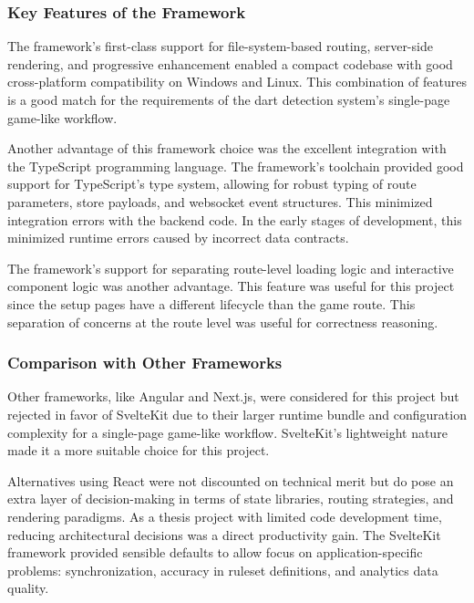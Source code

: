 \subsubsection{Key Features of the Framework}
The framework's first-class support for file-system-based routing, server-side rendering, and progressive enhancement enabled a compact codebase with good cross-platform compatibility on Windows and Linux. This combination of features is a good match for the requirements of the dart detection system's single-page game-like workflow.

Another advantage of this framework choice was the excellent integration with the TypeScript programming language. The framework's toolchain provided good support for TypeScript's type system, allowing for robust typing of route parameters, store payloads, and websocket event structures. This minimized integration errors with the backend code. In the early stages of development, this minimized runtime errors caused by incorrect data contracts.

The framework's support for separating route-level loading logic and interactive component logic was another advantage. This feature was useful for this project since the setup pages have a different lifecycle than the game route. This separation of concerns at the route level was useful for correctness reasoning.

\subsubsection{Comparison with Other Frameworks}
Other frameworks, like Angular and Next.js, were considered for this project but rejected in favor of SvelteKit due to their larger runtime bundle and configuration complexity for a single-page game-like workflow. SvelteKit's lightweight nature made it a more suitable choice for this project.

Alternatives using React were not discounted on technical merit but do pose an extra layer of decision-making in terms of state libraries, routing strategies, and rendering paradigms. As a thesis project with limited code development time, reducing architectural decisions was a direct productivity gain. The SvelteKit framework provided sensible defaults to allow focus on application-specific problems: synchronization, accuracy in ruleset definitions, and analytics data quality.

\vspace{\baselineskip}

